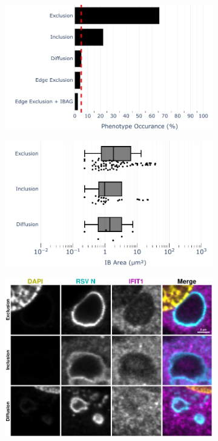 \begin{figure}
    \begin{subfigure}{0.5\textwidth}
        \caption{}
        \includegraphics[width=1\linewidth]{09. Chapter 4/Figs/02. Infection/01. IFIT1/07. bar_i1_mdbk.pdf} 
    \end{subfigure}
    \begin{subfigure}{0.5\textwidth}
        \caption{}
        \includegraphics[width=1\linewidth]{09. Chapter 4/Figs/02. Infection/01. IFIT1/08. box_i1_mdbk.pdf}
    \end{subfigure}
    \begin{subfigure}{1\textwidth}
        \centering
        \caption{}
        \includegraphics[width=1\linewidth]{09. Chapter 4/Figs/02. Infection/01. IFIT1/09. mdbk i1.pdf}

\end{subfigure}
\end{figure}
